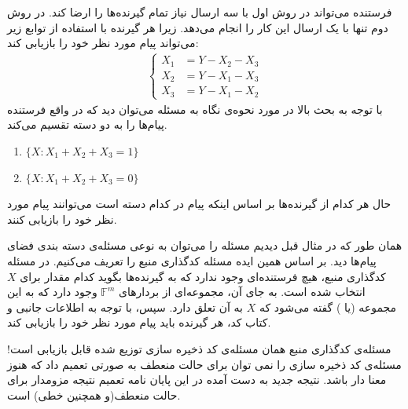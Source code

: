 \begin{example}
\begin{minipage}{0.5\textwidth}
	\end{minipage}
	\newline
		فرستنده می‌تواند در روش اول با سه ارسال نیاز تمام گیرنده‌ها را ارضا کند. در روش دوم تنها با یک ارسال این کار را انجام می‌دهد. زیرا هر گیرنده با استفاده از توابع زیر می‌تواند پیام مورد نظر خود را بازیابی کند:
	\begin{align*}
		\begin{cases}
				X_1 &= Y - X_2 - X_3 \\
				X_2 &= Y - X_1 - X_3  \\
				X_3 &= Y - X_1 - X_2  
			\end{cases}   
	\end{align*}
	با توجه به بحث بالا در مورد نحوه‌ی نگاه به مسئله می‌توان دید که در واقع فرستنده پیام‌ها را به دو دسته تقسیم می‌کند.
	\begin{latin}

		\begin{enumerate}
			\centering
			\item $\{X: X_1 + X_2 + X_3 = 1\}$
			\item $\{X: X_1 + X_2 + X_3 = 0\}$
		\end{enumerate}
	\end{latin}
	حال هر کدام از گیرنده‌ها بر اساس اینکه پیام در کدام دسته است می‌توانند پیام مورد نظر خود را بازیابی کنند.
\end{example}

همان طور که در مثال قبل دیدیم مسئله 
\icod
 را می‌توان به نوعی مسئله‌ی دسته بندی فضای پیام‌ها دید. بر اساس همین ایده مسئله کدگذاری منبع را تعریف می‌کنیم. در مسئله کدگذاری منبع، هیچ فرستنده‌ای وجود ندارد که به گیرنده‌ها بگوید کدام مقدار برای $X$ انتخاب شده است. به جای آن، مجموعه‌ای از بردارهای
  $\mathbb{F}^m$
   وجود دارد که به این مجموعه
 (یا 
 ) گفته می‌شود که $X$ به آن تعلق دارد. سپس، با توجه به اطلاعات جانبی و کتاب کد، هر گیرنده باید پیام مورد نظر خود را بازیابی کند.
\begin{observation}
	مسئله‌ی کدگذاری منبع همان مسئله‌ی کد ذخیره سازی توزیع شده قابل بازیابی است! مسئله‌ی کد ذخیره سازی را نمی توان برای حالت منعطف به صورتی تعمیم داد که هنوز معنا دار باشد. نتیجه جدید به دست آمده در این پایان نامه تعمیم نتیجه مزومدار برای حالت منعطف(و همچنین خطی) است.
\end{observation}

